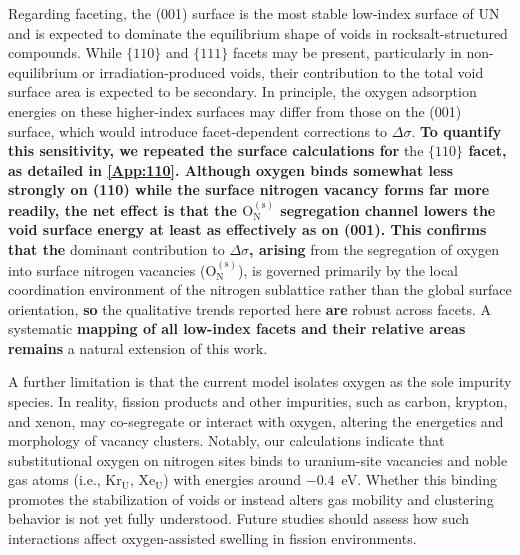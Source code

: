 \documentclass[preprint,12pt,sort&compress]{elsarticle}
\newcommand{\?}{\stackrel{?}{=}}
\providecommand{\DIFaddtex}[1]{{\bf #1}} %
\providecommand{\DIFdeltex}[1]{} %
\providecommand{\DIFaddbegin}{\protect\color{blue}} %
\providecommand{\DIFaddend}{\protect\color{black}} %
\providecommand{\DIFdelbegin}{\protect\color{red}} %
\providecommand{\DIFdelend}{\protect\color{black}} %
\providecommand{\DIFadd}[1]{\texorpdfstring{\DIFaddtex{#1}}{#1}} %
\providecommand{\DIFdel}[1]{\texorpdfstring{\DIFdeltex{#1}}{}} %
\begin{document}
Regarding faceting, the (001) surface is the most stable low-index surface of UN \cite{Zhukovskii2009SS} and is expected to dominate the equilibrium shape of voids in rocksalt-structured compounds. While $\{110\}$ and $\{111\}$ facets may be present, particularly in non-equilibrium or irradiation-produced voids, their contribution to the total void surface area is expected to be secondary. In principle, the oxygen adsorption energies on these higher-index surfaces may differ from those on the (001) surface, which would introduce facet-dependent corrections to $\Delta\sigma$. \DIFdelbegin \DIFdel{Quantifying these corrections would require dedicated slab calculations for each facetorientation, which is beyond the scope of the present work. Nevertheless, because }\DIFdelend \DIFaddbegin \DIFadd{To quantify this sensitivity, we repeated the surface calculations for }\DIFaddend the \DIFaddbegin \DIFadd{$\{110\}$ facet, as detailed in \ref{App:110}. Although oxygen binds somewhat less strongly on (110) while the surface nitrogen vacancy forms far more readily, the net effect is that the $\text{O}_\text{N}^{(\text{s})}$ segregation channel lowers the void surface energy at least as effectively as on (001). This confirms that the }\DIFaddend dominant contribution to $\Delta\sigma$\DIFdelbegin \DIFdel{arises }\DIFdelend \DIFaddbegin \DIFadd{, arising }\DIFaddend from the segregation of oxygen into surface nitrogen vacancies (O$_\mathrm{N}^{(\mathrm{s})}$), \DIFdelbegin \DIFdel{which }\DIFdelend is governed primarily by the local coordination environment of the nitrogen sublattice rather than the global surface orientation, \DIFdelbegin \DIFdel{we expect }\DIFdelend \DIFaddbegin \DIFadd{so }\DIFaddend the qualitative trends reported here \DIFdelbegin \DIFdel{to be }\DIFdelend \DIFaddbegin \DIFadd{are }\DIFaddend robust across facets. A systematic \DIFdelbegin \DIFdel{investigation of facet-dependent adsorption energies and their impact on void stabilization is }\DIFdelend \DIFaddbegin \DIFadd{mapping of all low-index facets and their relative areas remains }\DIFaddend a natural extension of this work.

A further limitation is that the current model isolates oxygen as the sole impurity species. In reality, fission products and other impurities, such as carbon, krypton, and xenon, may co-segregate or interact with oxygen, altering the energetics and morphology of vacancy clusters. Notably, our calculations indicate that substitutional oxygen on nitrogen sites binds to uranium-site vacancies and noble gas atoms (i.e., Kr$_\text{U}$, Xe$_\text{U}$) with energies around $-0.4$~eV. Whether this binding promotes the stabilization of voids or instead alters gas mobility and clustering behavior is not yet fully understood. Future studies should assess how such interactions affect oxygen-assisted swelling in fission environments.
\end{document}
